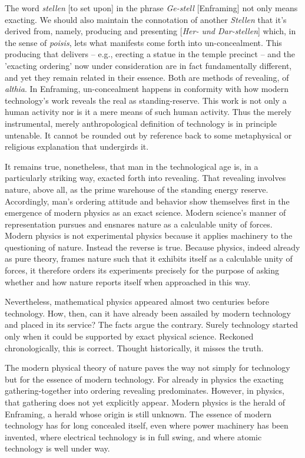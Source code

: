 The word \textit{stellen} [to set upon] in the phrase \textit{Ge-stell} [Enframing] not only means exacting. We should also maintain the connotation of another \textit{Stellen} that it's derived from, namely, producing and presenting [\textit{Her- und Dar-stellen}] which, in the sense of \textit{poisis}, lets what manifests come forth into un-concealment. This producing that delivers -- e.g., erecting a statue in the temple precinct -- and the 'exacting ordering' now under consideration are in fact fundamentally different, and yet they remain related in their essence. Both are methods of revealing, of \textit{althia}. In Enframing, un-concealment happens in conformity with how modern technology's work reveals the real as standing-reserve. This work is not only a human activity nor is it a mere means of such human activity. Thus the merely instrumental, merely anthropological definition of technology is in principle untenable. It cannot be rounded out by reference back to some metaphysical or religious explanation that undergirds it.

It remains true, nonetheless, that man in the technological age is, in a particularly striking way, exacted forth into revealing. That revealing involves nature, above all, as the prime warehouse of the standing energy reserve. Accordingly, man's ordering attitude and behavior show themselves first in the emergence of modern physics as an exact science. Modern science's manner of representation pursues and ensnares nature as a calculable unity of forces. Modern physics is not experimental physics because it applies machinery to the questioning of nature. Instead the reverse is true. Because physics, indeed already as pure theory, frames nature such that it exhibits itself as a calculable unity of forces, it therefore orders its experiments precisely for the purpose of asking whether and how nature reports itself when approached in this way.

Nevertheless, mathematical physics appeared almost two centuries before technology. How, then, can it have already been assailed by modern technology and placed in its service? The facts argue the contrary. Surely technology started only when it could be supported by exact physical science. Reckoned chronologically, this is correct. Thought historically, it misses the truth.

The modern physical theory of nature paves the way not simply for technology but for the essence of modern technology. For already in physics the exacting gathering-together into ordering revealing predominates. However, in physics, that gathering does not yet explicitly appear. Modern physics is the herald of Enframing, a herald whose origin is still unknown. The essence of modern technology has for long concealed itself, even where power machinery has been invented, where electrical technology is in full swing, and where atomic technology is well under way.

